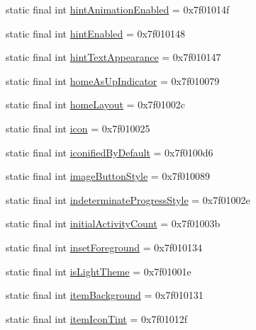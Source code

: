 \begin{CompactItemize}
\item 
static final int \hyperlink{classandroid_1_1support_1_1mediacompat_1_1_r_1_1attr_106cee13edf09de09a3254317b3d7032}{hintAnimationEnabled} = 0x7f01014f
\item 
static final int \hyperlink{classandroid_1_1support_1_1mediacompat_1_1_r_1_1attr_8236087cbb74b93b071412349d627c7f}{hintEnabled} = 0x7f010148
\item 
static final int \hyperlink{classandroid_1_1support_1_1mediacompat_1_1_r_1_1attr_2ba2deefc86f49c16c1a6ebf4c4e96cf}{hintTextAppearance} = 0x7f010147
\item 
static final int \hyperlink{classandroid_1_1support_1_1mediacompat_1_1_r_1_1attr_a4faf8a0a170e27fc597240efe6adc7d}{homeAsUpIndicator} = 0x7f010079
\item 
static final int \hyperlink{classandroid_1_1support_1_1mediacompat_1_1_r_1_1attr_306313530712987c0f840742a69daf5d}{homeLayout} = 0x7f01002c
\item 
static final int \hyperlink{classandroid_1_1support_1_1mediacompat_1_1_r_1_1attr_1a91f8bd41a9574aef956b700e3a04e3}{icon} = 0x7f010025
\item 
static final int \hyperlink{classandroid_1_1support_1_1mediacompat_1_1_r_1_1attr_edc52917aad9976f4e93fec41505ec85}{iconifiedByDefault} = 0x7f0100d6
\item 
static final int \hyperlink{classandroid_1_1support_1_1mediacompat_1_1_r_1_1attr_65500f3e5a0e5361c98528a36dcceb73}{imageButtonStyle} = 0x7f010089
\item 
static final int \hyperlink{classandroid_1_1support_1_1mediacompat_1_1_r_1_1attr_3b0e4bced3042c212cfe53219cd9d0c2}{indeterminateProgressStyle} = 0x7f01002e
\item 
static final int \hyperlink{classandroid_1_1support_1_1mediacompat_1_1_r_1_1attr_e7440a6a439994997e83d30cbc791459}{initialActivityCount} = 0x7f01003b
\item 
static final int \hyperlink{classandroid_1_1support_1_1mediacompat_1_1_r_1_1attr_d903f082ccd1e9393395296495b0a2fd}{insetForeground} = 0x7f010134
\item 
static final int \hyperlink{classandroid_1_1support_1_1mediacompat_1_1_r_1_1attr_d9c9d202035643e45300e1f27f6bd37d}{isLightTheme} = 0x7f01001e
\item 
static final int \hyperlink{classandroid_1_1support_1_1mediacompat_1_1_r_1_1attr_0480db04b2e9388e7d45db6f3601e202}{itemBackground} = 0x7f010131
\item 
static final int \hyperlink{classandroid_1_1support_1_1mediacompat_1_1_r_1_1attr_b0e8c5ac9b86a3064f1c6009e9257216}{itemIconTint} = 0x7f01012f

\end{CompactItemize}

